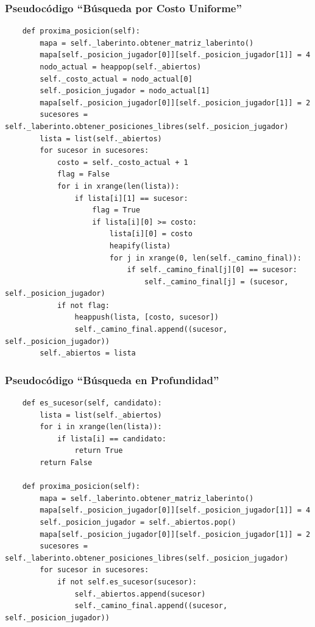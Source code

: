 \documentclass[letter, titlepage, 10pt]{article}
\begin{document}
\subsubsection{Pseudocódigo ``Búsqueda por Costo Uniforme''}
\begin{lstlisting}
    def proxima_posicion(self):
        mapa = self._laberinto.obtener_matriz_laberinto()
        mapa[self._posicion_jugador[0]][self._posicion_jugador[1]] = 4
        nodo_actual = heappop(self._abiertos)
        self._costo_actual = nodo_actual[0]
        self._posicion_jugador = nodo_actual[1]
        mapa[self._posicion_jugador[0]][self._posicion_jugador[1]] = 2
        sucesores = self._laberinto.obtener_posiciones_libres(self._posicion_jugador)
        lista = list(self._abiertos)
        for sucesor in sucesores:
            costo = self._costo_actual + 1
            flag = False
            for i in xrange(len(lista)):
                if lista[i][1] == sucesor:
                    flag = True
                    if lista[i][0] >= costo:
                        lista[i][0] = costo
                        heapify(lista)
                        for j in xrange(0, len(self._camino_final)):
                            if self._camino_final[j][0] == sucesor:
                                self._camino_final[j] = (sucesor, self._posicion_jugador)
            if not flag:
                heappush(lista, [costo, sucesor])
                self._camino_final.append((sucesor, self._posicion_jugador))
        self._abiertos = lista
\end{lstlisting}


\newpage
\subsubsection{Pseudocódigo ``Búsqueda en Profundidad''}
\begin{lstlisting}
    def es_sucesor(self, candidato):
        lista = list(self._abiertos)
        for i in xrange(len(lista)):
            if lista[i] == candidato:
                return True
        return False

    def proxima_posicion(self):
        mapa = self._laberinto.obtener_matriz_laberinto()
        mapa[self._posicion_jugador[0]][self._posicion_jugador[1]] = 4
        self._posicion_jugador = self._abiertos.pop()
        mapa[self._posicion_jugador[0]][self._posicion_jugador[1]] = 2
        sucesores = self._laberinto.obtener_posiciones_libres(self._posicion_jugador)
        for sucesor in sucesores:
            if not self.es_sucesor(sucesor):
                self._abiertos.append(sucesor)
                self._camino_final.append((sucesor, self._posicion_jugador))
\end{lstlisting}
\end{document}
